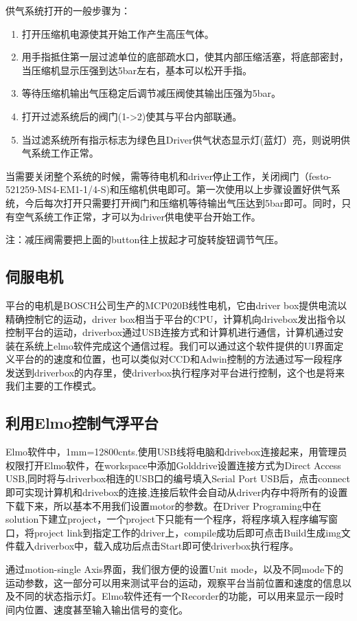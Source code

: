\documentclass[onecolumn,a4paper,10pt]{article}
\begin{document}
供气系统打开的一般步骤为：
\begin{enumerate}
\item 打开压缩机电源使其开始工作产生高压气体。
\item 用手指抵住第一层过滤单位的底部疏水口，使其内部压缩活塞，将底部密封，当压缩机显示压强到达5bar左右，基本可以松开手指。
\item 等待压缩机输出气压稳定后调节减压阀使其输出压强为5bar。
\item 打开过滤系统后的阀门(1->2)使其与平台内部联通。
\item 当过滤系统所有指示标志为绿色且Driver供气状态显示灯(蓝灯）亮，则说明供气系统工作正常。
\end{enumerate}

当需要关闭整个系统的时候，{\color{red}需等待电机和driver停止工作}，关闭阀门（festo-521259-MS4-EM1-1/4-S)和压缩机供电即可。第一次使用以上步骤设置好供气系统，今后每次打开只需要打开阀门和压缩机等待输出气压达到5bar即可。同时，只有空气系统工作正常，才可以为driver供电使平台开始工作。

注：减压阀需要把上面的button往上拔起才可旋转旋钮调节气压。


\subsection{伺服电机}
平台的电机是BOSCH公司生产的MCP020B线性电机，它由driver box提供电流以精确控制它的运动，driver box相当于平台的CPU，计算机向drivebox发出指令以控制平台的运动，driverbox通过USB连接方式和计算机进行通信，计算机通过安装在系统上elmo软件完成这个通信过程。我们可以通过这个软件提供的UI界面定义平台的的速度和位置，也可以类似对CCD和Adwin控制的方法通过写一段程序发送到driverbox的内存里，使driverbox执行程序对平台进行控制，这个也是将来我们主要的工作模式。
\subsection{利用Elmo控制气浮平台}
Elmo软件中，1mm=12800cnts.使用USB线将电脑和drivebox连接起来，用管理员权限打开Elmo软件，在workspace中添加Golddrive设置连接方式为Direct Access USB,同时将与driverbox相连的USB口的编号填入Serial Port USB后，点击connect即可实现计算机和drivebox的连接,连接后软件会自动从driver内存中将所有的设置下载下来，所以基本不用我们设置motor的参数。在Driver Programing中在solution下建立project，一个project下只能有一个程序，将程序填入程序编写窗口，将project link到指定工作的driver上，compile成功后即可点击Build生成img文件载入driverbox中，载入成功后点击Start即可使driverbox执行程序。

通过motion-single Axis界面，我们很方便的设置Unit mode，以及不同mode下的运动参数，这一部分可以用来测试平台的运动，观察平台当前位置和速度的信息以及不同的状态指示灯。Elmo软件还有一个Recorder的功能，可以用来显示一段时间内位置、速度甚至输入输出信号的变化。
\end{document}
